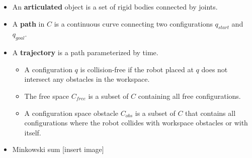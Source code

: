\documentclass[../main.tex]{subfiles}
\begin{document}
\begin{itemize}
        \item An \textbf{articulated} object is a set of rigid bodies connected by joints.
        \item A \textbf{path} in $C$ is a continuous curve connecting two configurations $q_{start}$ and $q_{goal}$.
        \item A \textbf{trajectory} is a path parameterized by time.
        \begin{itemize}
            \item A configuration $q$ is collision-free if the robot placed at $q$ does not intersect any obstacles in the workspace.
            \item The free space $C_{free}$ is a subset of $C$ containing all free configurations.
            \item A configuration space obstacle $C_{obs}$ is a subset of $C$ that contains all configurations where the robot collides with workspace obstacles or with itself.
        \end{itemize}
        \item Minkowski sum [insert image]
    \end{itemize}
\end{document}
